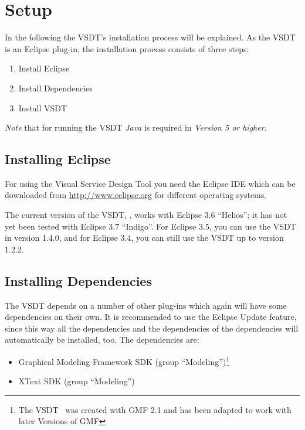\chapter{Setup}
\label{sec:user_setup}

In the following the VSDT's installation process will be explained.  As the VSDT
is an Eclipse plug-in, the installation process consists of three steps:
\begin{enumerate}
	\item Install Eclipse
	\item Install Dependencies
	\item Install VSDT
\end{enumerate}

\emph{Note} that for running the VSDT \emph{Java} is required in \emph{Version 5
or higher}.



\section{Installing Eclipse}

For using the Visual Service Design Tool you need the Eclipse IDE which can be
downloaded from \url{http://www.eclipse.org} for different operating systems.

The current version of the VSDT, \version, works with Eclipse 3.6 ``Helios''; it
has not yet been tested with Eclipse 3.7 ``Indigo''.
For Eclipse 3.5, you can use the VSDT in version 1.4.0, and for Eclipse 3.4, you
can still use the VSDT up to version 1.2.2.





\section{Installing Dependencies}

The VSDT depends on a number of other plug-ins which again will have some
dependencies on their own.  It is recommended to use the Eclipse Update feature,
since this way all the dependencies and the dependencies of the dependencies
will automatically be installed, too.  The dependencies are:

\begin{itemize}
	\item Graphical Modeling Framework SDK (group ``Modeling'')\footnote{The VSDT
	\version\ was created with GMF 2.1 and has been adapted to work with later
	Versions of GMF}
	
	\item XText SDK (group ``Modeling'')
\end{itemize}

